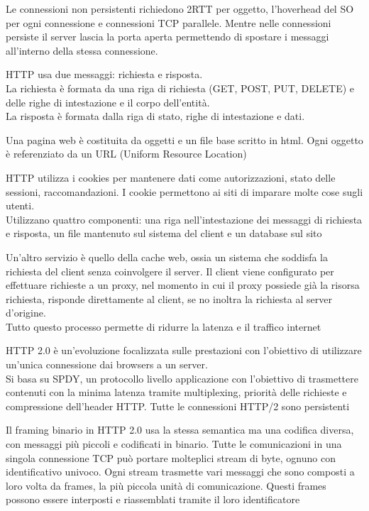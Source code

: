 \documentclass[12pt, a4paper]{article}
\begin{document}
Le connessioni non persistenti richiedono 2RTT per oggetto, l'hoverhead del SO per ogni connessione e connessioni TCP parallele.
Mentre nelle connessioni persiste il server lascia la porta aperta permettendo di spostare i messaggi all'interno della stessa 
connessione.

HTTP usa due messaggi: richiesta e risposta.\\La richiesta è formata da una riga di richiesta (GET, POST, PUT, DELETE) e delle 
righe di intestazione e il corpo dell'entità.\\La risposta è formata dalla riga di stato, righe di intestazione e dati.

Una pagina web è costituita da oggetti e un file base scritto in html. Ogni oggetto è referenziato da un URL (Uniform Resource 
Location)

HTTP utilizza i cookies per mantenere dati come autorizzazioni, stato delle sessioni, raccomandazioni. I cookie permettono
ai siti di imparare molte cose sugli utenti.\\Utilizzano quattro componenti: una riga nell'intestazione dei messaggi di 
richiesta e risposta, un file mantenuto sul sistema del client e un database sul sito

Un'altro servizio è quello della cache web, ossia un sistema che soddisfa la richiesta del client senza coinvolgere il server.
Il client viene configurato per effettuare richieste a un proxy, nel momento in cui il proxy possiede già la risorsa richiesta,
risponde direttamente al client, se no inoltra la richiesta al server d'origine.\\Tutto questo processo permette di ridurre 
la latenza e il traffico internet

HTTP 2.0 è un'evoluzione focalizzata sulle prestazioni con l'obiettivo di utilizzare un'unica connessione dai browsers a 
un server.\\Si basa su SPDY, un protocollo livello applicazione con l'obiettivo di trasmettere contenuti con la minima 
latenza tramite multiplexing, priorità delle richieste e compressione dell'header HTTP. Tutte le connessioni HTTP/2
sono persistenti

Il framing binario in HTTP 2.0 usa la stessa semantica ma una codifica diversa, con messaggi più piccoli e codificati in 
binario. Tutte le comunicazioni in una singola connessione TCP può portare molteplici stream di byte, ognuno con identificativo 
univoco. Ogni stream trasmette vari messaggi che sono composti a loro volta da frames, la più piccola unità di 
comunicazione. Questi frames possono essere interposti e riassemblati tramite il loro identificatore
\end{document}
